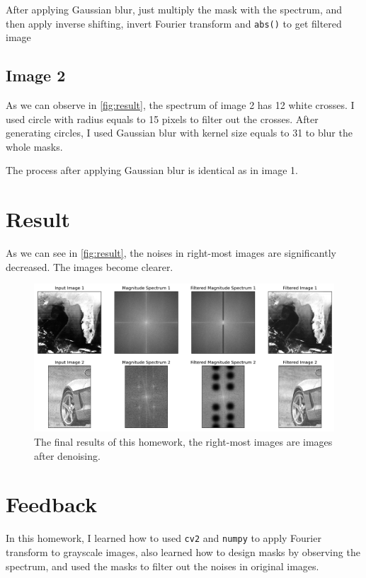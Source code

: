 \documentclass[twocolumn]{extarticle}
\begin{document}
After applying Gaussian blur, just multiply the mask with the spectrum, and then apply inverse shifting, invert Fourier transform and \texttt{abs()} to get filtered image

\subsection{Image 2}

As we can observe in \autoref{fig:result}, the spectrum of image 2 has 12 white crosses. I used circle with radius equals to 15 pixels to filter out the crosses. After generating circles, I used Gaussian blur with kernel size equals to 31 to blur the whole masks.

The process after applying Gaussian blur is identical as in image 1.

\section{Result}

As we can see in \autoref{fig:result}, the noises in right-most images are significantly decreased. The images become clearer.

\begin{figure}[b]
\centering
\includegraphics[width=0.95\linewidth]{result}
\caption{The final results of this homework, the right-most images are images after denoising.}
\label{fig:result}
\end{figure}


\section{Feedback}

In this homework, I learned how to used \texttt{cv2} and \texttt{numpy} to apply Fourier transform to grayscale images, also learned how to design masks by observing the spectrum, and used the masks to filter out the noises in original images.
\end{document}
